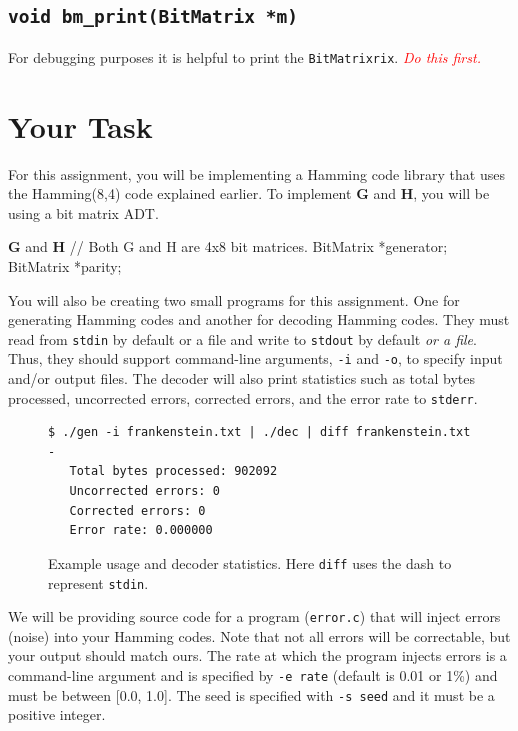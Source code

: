 \documentclass[11pt]{article}
\begin{document}
\subsection{\texttt{void bm\_print(BitMatrix *m)}}
For debugging purposes it is helpful to print the \texttt{BitMatrixrix}. 
\textcolor{red}{\emph{Do this first.}}

\section{Your Task}
For this assignment, you will be implementing a Hamming code library that uses the Hamming(8,4) code
explained earlier. To implement $\boldsymbol{G}$ and $\boldsymbol{H}$, you will be using a bit matrix ADT.

\begin{codelisting}{$\boldsymbol{G}$ and $\boldsymbol{H}$}
// Both G and H are 4x8 bit matrices.
BitMatrix *generator;
BitMatrix *parity;
\end{codelisting}

You will also be creating
two small programs for this assignment. One for generating Hamming codes and another for decoding Hamming codes.
They must read from \texttt{stdin} by default or a file and write to \texttt{stdout} by default \emph{or a file}. Thus,
they should support command-line arguments, \texttt{-i} and \texttt{-o}, to specify input and/or output files.
The decoder will also print statistics such as total bytes processed, uncorrected errors, corrected errors, and
the error rate to \texttt{stderr}.

\begin{figure}[ht]
\begin{centering}
  \begin{lstlisting}[style=bashstyle]
 $ ./gen -i frankenstein.txt | ./dec | diff frankenstein.txt -
   Total bytes processed: 902092
   Uncorrected errors: 0
   Corrected errors: 0
   Error rate: 0.000000
  \end{lstlisting}
  \caption{Example usage and decoder statistics. Here \texttt{diff} uses the dash
  to represent \texttt{stdin}. }
\end{centering}
\end{figure}

We will be providing source code for a program (\texttt{error.c}) that will inject errors (noise) into your
Hamming codes. Note that
not all errors will be correctable, but your output should match ours. The rate at which
the program injects errors is a command-line argument and is specified by \texttt{-e rate} (default is 0.01 or 1\%)
and must be between [0.0, 1.0]. The seed
is specified with \texttt{-s seed} and it must be a positive integer.
\end{document}

